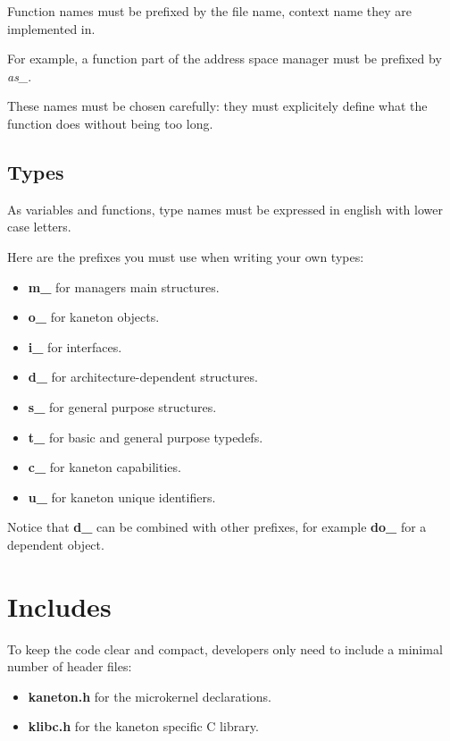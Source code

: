 Function names must be prefixed by the file name, context name they are
implemented in.

For example, a function part of the address space manager must be prefixed
by \textit{as\_}.

These names must be chosen carefully: they must explicitely define
what the function does without being too long.

%
%

\subsection{Types}

As variables and functions, type names must be expressed in english
with lower case letters.

Here are the prefixes you must use when writing your own types:

\begin{itemize}
  \item
    \textbf{m\_} for managers main structures.
  \item
    \textbf{o\_} for kaneton objects.
  \item
    \textbf{i\_} for interfaces.
  \item
    \textbf{d\_} for architecture-dependent structures.
  \item
    \textbf{s\_} for general purpose structures.
  \item
    \textbf{t\_} for basic and general purpose typedefs.
  \item
    \textbf{c\_} for kaneton capabilities.
  \item
    \textbf{u\_} for kaneton unique identifiers.
\end{itemize}

Notice that \textbf{d\_} can be combined with other prefixes, for
example \textbf{do\_} for a dependent object.

%
%

\section{Includes}

To keep the code clear and compact, developers only need to include a
minimal number of header files:

\begin{itemize}
  \item
    \textbf{kaneton.h} for the microkernel declarations.
  \item
    \textbf{klibc.h} for the kaneton specific C library.
\end{itemize}

